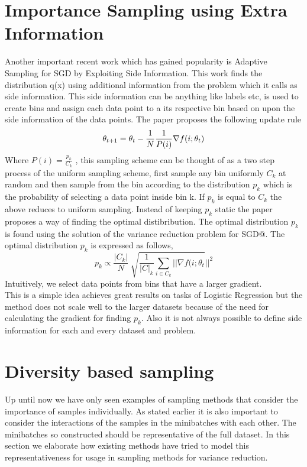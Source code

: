 \documentclass[a4paper,twoside]{iiththesis}
\theoremstyle{definition}
\theoremstyle{definition}
\theoremstyle{remark}
\begin{document}
\section{Importance Sampling using Extra Information}

Another important recent work which has gained popularity is Adaptive Sampling for SGD by Exploiting Side Information\cite{gopal2016adaptive}. This work finds the distribution q(x) using additional information from the problem which it calls as side information. This side information can be anything like labels etc, is used to create bins and assign each data point to a its respective bin based on upon the side information of the data points. The paper proposes the following update rule 
\begin{equation}
\theta_{t+1} = \theta_{t} - \frac{1}{N} \frac{1}{P(i)}\nabla f(i; \theta_{t}) \\ 
\end{equation}
Where  $P(i) = \frac{p_k}{C_k}$ , this sampling scheme can be thought of as a two step process of the uniform sampling scheme, first sample any bin uniformly  $C_k$ at random and then sample from the bin according to the distribution $p_k$ which is the probability of selecting a data point inside bin k. If $p_k$ is equal to $C_k$ the above reduces to uniform sampling. Instead of keeping $p_k$ static the paper proposes a way of finding the optimal distibribution. The optimal distribution $p_k$ is found using the solution of the variance reduction problem for SGD@. The optimal distribution $p_k$ is expressed as follows, 
\begin{equation} \label{gopal}
p_k \propto \frac{|C_k|}{N} \sqrt[]{\frac{1}{|C|_k} \sum_{i \in C_k } || \nabla f(i; \theta_t} || ^2
\end{equation}
Intuitively, we select data points from bins that have a larger gradient. \\
This is a simple idea achieves great results on tasks of Logistic Regression but the method does not scale well to the larger datasets because of the need for calculating the gradient for finding $p_k$. Also it is not always possible to define side information for each and every dataset and problem.  

\section{Diversity based sampling}

Up until now we have only seen examples of sampling methods that consider the importance of samples individually. As stated earlier it is also important to consider the interactions of the samples in the minibatches with each other. The minibatches so constructed should be representative of the full dataset. In this section we elaborate how existing methods have tried to model this representativeness for usage in sampling methods for variance reduction.
\end{document}
